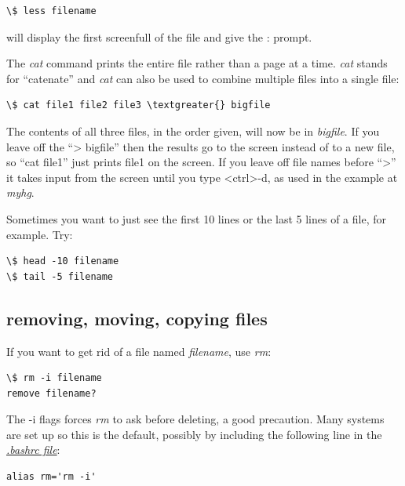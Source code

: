 \documentclass[letterpaper,10pt,english]{sphinxmanual}
\begin{document}
\begin{Verbatim}[commandchars=\\\{\}]
\$ less filename
\end{Verbatim}

will display the first screenfull of the file and give the : prompt.

The \emph{cat} command prints the entire file rather than a page at a time.
\emph{cat} stands for ``catenate'' and \emph{cat} can also be used to combine multiple
files into a single file:

\begin{Verbatim}[commandchars=\\\{\}]
\$ cat file1 file2 file3 \textgreater{} bigfile
\end{Verbatim}

The contents of all three files, in the order given, will now be in
\emph{bigfile}.  If you leave off the ``\textgreater{} bigfile'' then the results go to the
screen instead of to a new file, so ``cat file1'' just prints file1 on the
screen.  If you leave off file names before ``\textgreater{}'' it takes input from the
screen until you type \textless{}ctrl\textgreater{}-d, as used in the example at \emph{myhg}.

Sometimes you want to just see the first 10 lines or the last 5 lines of a
file, for example.  Try:

\begin{Verbatim}[commandchars=\\\{\}]
\$ head -10 filename
\$ tail -5 filename
\end{Verbatim}


\subsection{removing, moving, copying files}
\label{unix:removing-moving-copying-files}
If you want to get rid of a file named \emph{filename}, use \emph{rm}:

\begin{Verbatim}[commandchars=\\\{\}]
\$ rm -i filename
remove filename?
\end{Verbatim}

The -i flags forces \emph{rm} to ask before deleting, a good precaution.  Many
systems are set up so this is the default, possibly by including the
following line in the {\hyperref[unix:bashrc]{\emph{.bashrc file}}}:

\begin{Verbatim}[commandchars=\\\{\}]
alias rm='rm -i'
\end{Verbatim}
\end{document}
